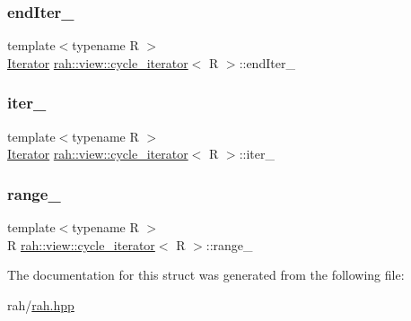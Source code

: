 \mbox{\label{structrah_1_1view_1_1cycle__iterator_ac2b991834504ffc79a0d477588a4668e}} 
\subsubsection{\texorpdfstring{endIter\_}{endIter\_}}
{\footnotesize\ttfamily template$<$typename R $>$ \\
\mbox{\hyperlink{structrah_1_1view_1_1cycle__iterator_ac9761016862e6bb26b0ca5e923344b83}{Iterator}} \mbox{\hyperlink{structrah_1_1view_1_1cycle__iterator}{rah\+::view\+::cycle\+\_\+iterator}}$<$ R $>$\+::end\+Iter\+\_\+}

\mbox{\label{structrah_1_1view_1_1cycle__iterator_a49dea5baf32f7e9bc237b6f534513ada}} 
\subsubsection{\texorpdfstring{iter\_}{iter\_}}
{\footnotesize\ttfamily template$<$typename R $>$ \\
\mbox{\hyperlink{structrah_1_1view_1_1cycle__iterator_ac9761016862e6bb26b0ca5e923344b83}{Iterator}} \mbox{\hyperlink{structrah_1_1view_1_1cycle__iterator}{rah\+::view\+::cycle\+\_\+iterator}}$<$ R $>$\+::iter\+\_\+}

\mbox{\label{structrah_1_1view_1_1cycle__iterator_ad82f54467048a95f8e8f05e5a78afb48}} 
\subsubsection{\texorpdfstring{range\_}{range\_}}
{\footnotesize\ttfamily template$<$typename R $>$ \\
R \mbox{\hyperlink{structrah_1_1view_1_1cycle__iterator}{rah\+::view\+::cycle\+\_\+iterator}}$<$ R $>$\+::range\+\_\+}



The documentation for this struct was generated from the following file\+:\begin{DoxyCompactItemize}
\item 
rah/\mbox{\hyperlink{rah_8hpp}{rah.\+hpp}}\end{DoxyCompactItemize}
